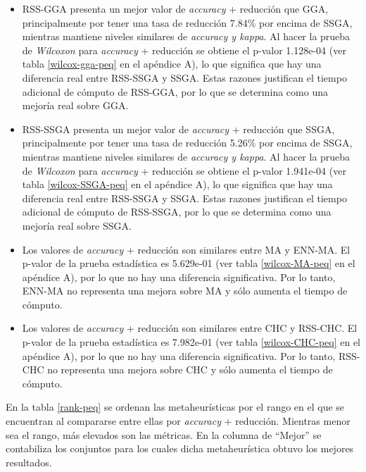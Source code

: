\begin{itemize}
 
\item RSS-GGA presenta un mejor valor de \emph{accuracy} + reducción que GGA, principalmente por tener una tasa de reducción 7.84\% por encima de SSGA, mientras mantiene niveles similares de \emph{accuracy y kappa}. Al hacer la prueba de \emph{Wilcoxon} para \emph{accuracy} + reducción se obtiene el p-valor 1.128e-04 (ver tabla \ref{wilcox-gga-peq} en el apéndice A), lo que significa que hay una diferencia real entre RSS-SSGA y SSGA. Estas razones justifican el tiempo adicional de cómputo de RSS-GGA, por lo que se determina como una mejoría real sobre GGA.

\item RSS-SSGA presenta un mejor valor de \emph{accuracy} + reducción que SSGA, principalmente por tener una tasa de reducción 5.26\% por encima de SSGA, mientras mantiene niveles similares de \emph{accuracy y kappa}. Al hacer la prueba de \emph{Wilcoxon} para \emph{accuracy} + reducción se obtiene el p-valor 1.941e-04 (ver tabla \ref{wilcox-SSGA-peq} en el apéndice A), lo que significa que hay una diferencia real entre RSS-SSGA y SSGA. Estas razones justifican el tiempo adicional de cómputo de RSS-SSGA, por lo que se determina como una mejoría real sobre SSGA.

\item Los valores de \emph{accuracy} + reducción son similares entre MA y ENN-MA. El p-valor de la prueba estadística es 5.629e-01 (ver tabla \ref{wilcox-MA-peq} en el apéndice A), por lo que no hay una diferencia significativa. Por lo tanto, ENN-MA no representa una mejora sobre MA y sólo aumenta el tiempo de cómputo.

\item  Los valores de \emph{accuracy} + reducción son similares entre CHC y RSS-CHC. El p-valor de la prueba estadística es 7.982e-01 (ver tabla \ref{wilcox-CHC-peq} en el apéndice A), por lo que no hay una diferencia significativa. Por lo tanto, RSS-CHC no representa una mejora sobre CHC y sólo aumenta el tiempo de cómputo.

\end{itemize}

En la tabla \ref{rank-peq} se ordenan las metaheurísticas por el rango en el que se encuentran al compararse entre ellas por \emph{accuracy} + reducción. Mientras menor sea el rango, más elevados son las métricas. En la columna de ``Mejor'' se contabiliza los conjuntos para los cuales dicha metaheurística obtuvo los mejores resultados.

